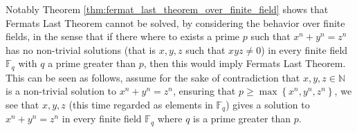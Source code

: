 Notably Theorem \ref{thm:fermat_last_theorem_over_finite_field} shows that Fermats Last Theorem cannot be solved, by considering the behavior over finite fields, in the sense that if there where to exists a prime $p$ such that $x^{n} + y^{n} = z^{n}$ has no non-trivial solutions (that is $x, y, z$ such that $xyz \neq 0$) in every finite field $\mathbb{F}_q$ with $q$ a prime greater than $p$, then this would imply Fermats Last Theorem. This can be seen as follows, assume for the sake of contradiction that $x, y, z \in \mathbb{N}$ is a non-trivial solution to $x^n + y^n = z^n$, ensuring that $p \geq \max \left\{x^{n}, y^{n}, z^{n}\right\}$, we see that $x, y, z$ (this time regarded as elements in $\mathbb{F}_q$) gives a solution to $x^n + y^n = z^n$ in every finite field $\mathbb{F}_q$ where $q$ is a prime greater than $p$.
\newpage

%
%
